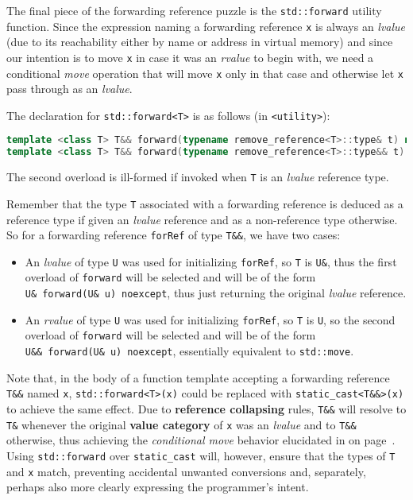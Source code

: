 The final piece of the forwarding reference puzzle is the
\texttt{std::forward} utility function. Since the expression naming a
forwarding reference \texttt{x} is always an \emph{lvalue} (due to its
reachability either by name or address in virtual memory) and since our
intention is to move \texttt{x} in case it was an \emph{rvalue} to begin
with, we need a conditional \emph{move} operation that will move
\texttt{x} only in that case and otherwise let \texttt{x} pass through as
an \emph{lvalue}.

The declaration for \texttt{std::forward<T>} is as follows (in
\texttt{<utility>}):

\begin{lstlisting}[language=C++]
template <class T> T&& forward(typename remove_reference<T>::type& t) noexcept;
template <class T> T&& forward(typename remove_reference<T>::type&& t) noexcept;
\end{lstlisting}

\noindent The second overload is ill-formed if invoked when \texttt{T} is an
\emph{lvalue} reference type.

Remember that the type \texttt{T} associated with a forwarding reference
is deduced as a reference type if given an \emph{lvalue} reference and
as a non-reference type otherwise. So for a forwarding reference
\texttt{forRef} of type \texttt{T\&\&}, we have two cases:
\begin{itemize}
\item{An \emph{lvalue} of type \texttt{U} was used for initializing \texttt{forRef}, so \texttt{T} is \texttt{U\&}, thus the first overload of \texttt{forward} will be selected and will be of the form \texttt{U\&}~\texttt{forward(U\&}~\texttt{u)}~\texttt{noexcept}, thus just returning the original \emph{lvalue} reference.}
\item{An \emph{rvalue} of type \texttt{U} was used for initializing \texttt{forRef}, so \texttt{T} is \texttt{U}, so the second overload of \texttt{forward} will be selected and will be of the form \texttt{U\&\&}~\texttt{forward(U\&}~\texttt{u)}~\texttt{noexcept}, essentially equivalent to \texttt{std::move}.}
\end{itemize}
Note that, in the body of a function template accepting a forwarding
reference \texttt{T\&\&} named \texttt{x}, \texttt{std::forward<T>(x)}
could be replaced with \texttt{static\_cast<T\&\&>(x)} to achieve the
same effect. Due to \textbf{reference collapsing} rules, \texttt{T\&\&}
will resolve to \texttt{T\&} whenever the original \textbf{value
category} of \texttt{x} was an \emph{lvalue} and to \texttt{T\&\&}
otherwise, thus achieving the \emph{conditional move} behavior
elucidated in \textit{} on page~\pageref{description-forwardingref}. Using \texttt{std::forward} over \texttt{static\_cast}
will, however, ensure that the types of \texttt{T} and \texttt{x} match,
preventing accidental unwanted conversions and, separately, perhaps also
more clearly expressing the programmer's intent.

